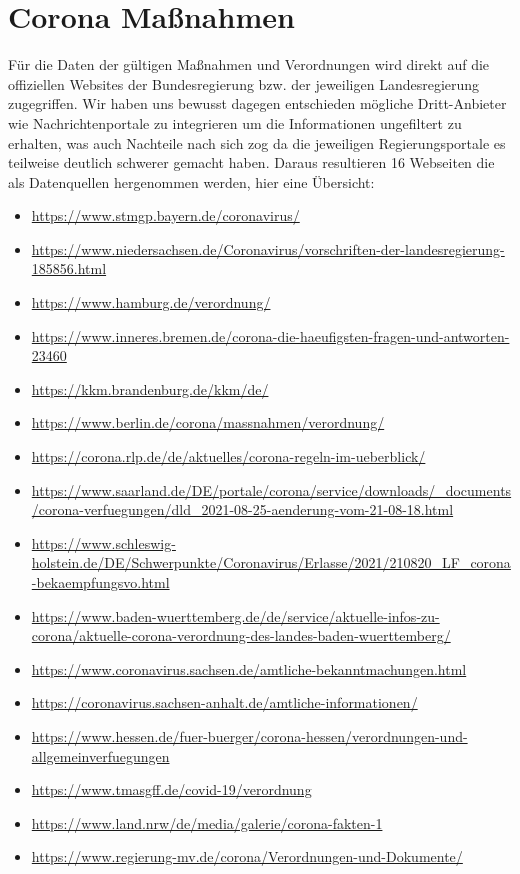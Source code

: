 \documentclass[12pt,oneside,a4paper,parskip]{scrbook}
\begin{document}
\section{Corona Maßnahmen}
Für die Daten der gültigen Maßnahmen und Verordnungen wird direkt auf die offiziellen Websites der Bundesregierung bzw. der jeweiligen Landesregierung zugegriffen. Wir haben uns bewusst dagegen entschieden mögliche Dritt-Anbieter wie Nachrichtenportale zu integrieren um die Informationen ungefiltert zu erhalten, was auch Nachteile nach sich zog da die jeweiligen Regierungsportale es teilweise deutlich schwerer gemacht haben. Daraus resultieren 16 Webseiten die als Datenquellen hergenommen werden, hier eine Übersicht:

\begin{itemize}
	\itemsep-1em
	\item \url{https://www.stmgp.bayern.de/coronavirus/}
	\item \url{https://www.niedersachsen.de/Coronavirus/vorschriften-der-landesregierung-185856.html}
	\item \url{https://www.hamburg.de/verordnung/}
	\item \url{https://www.inneres.bremen.de/corona-die-haeufigsten-fragen-und-antworten-23460}
	\item \url{https://kkm.brandenburg.de/kkm/de/}
	\item \url{https://www.berlin.de/corona/massnahmen/verordnung/}
	\item \url{https://corona.rlp.de/de/aktuelles/corona-regeln-im-ueberblick/}
	\item \url{https://www.saarland.de/DE/portale/corona/service/downloads/_documents/corona-verfuegungen/dld_2021-08-25-aenderung-vom-21-08-18.html}
	\item \url{https://www.schleswig-holstein.de/DE/Schwerpunkte/Coronavirus/Erlasse/2021/210820_LF_corona-bekaempfungsvo.html}
	\item \url{https://www.baden-wuerttemberg.de/de/service/aktuelle-infos-zu-corona/aktuelle-corona-verordnung-des-landes-baden-wuerttemberg/}
	\item \url{https://www.coronavirus.sachsen.de/amtliche-bekanntmachungen.html}
	\item \url{https://coronavirus.sachsen-anhalt.de/amtliche-informationen/}
	\item \url{https://www.hessen.de/fuer-buerger/corona-hessen/verordnungen-und-allgemeinverfuegungen}
	\item \url{https://www.tmasgff.de/covid-19/verordnung}
	\item \url{https://www.land.nrw/de/media/galerie/corona-fakten-1}
	\item \url{https://www.regierung-mv.de/corona/Verordnungen-und-Dokumente/}
\end{itemize}
\end{document}
